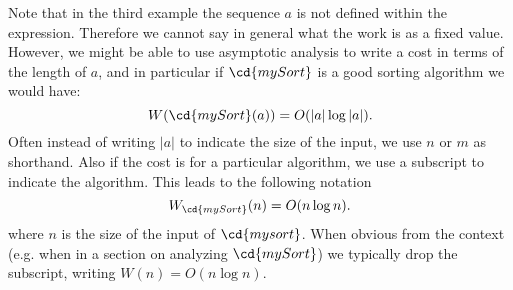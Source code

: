 \begin{cluster}
\label{grp:grm:analysis::models::using-input-size}

\begin{gram}
\label{grm:analysis::models::using-input-size}
Note that in the third example the sequence $a$ is not defined within
the expression.  Therefore we cannot say in general what the work is
as a fixed value.  However, we might be able to use asymptotic
analysis to write a cost in terms of the length of $a$, and in
particular if $\cd{mySort}$ is a good sorting algorithm we would have:
\[
W(\cd{mySort}(a)) = O(|a| \log |a|).
\]
Often instead of writing  $|a|$ to indicate the size of the input, we
use $n$ or $m$ as shorthand.  Also if the cost is for a particular
algorithm, we use a subscript to indicate the algorithm. This leads to
the following notation
\[
W_{\cd{mySort}}(n) = O(n \log n).
\]
where $n$ is the size of the input of $\cd{mysort}$.  When obvious
from the context (e.g. when in a section on analyzing $\cd{mySort}$)
we typically drop the subscript, writing $W(n) = O(n \log n)$.

\end{gram}
\end{cluster}

